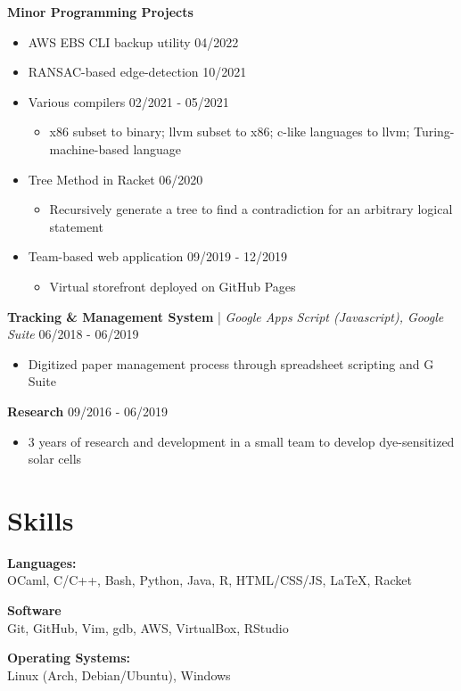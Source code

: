 \documentclass[10pt,letterpaper]{article}
\begin{document}
    \textbf{Minor Programming Projects}\hfill
    \begin{itemize}
      \item AWS EBS CLI backup utility \hfill 04/2022
      \item RANSAC-based edge-detection \hfill 10/2021
      \item Various compilers \hfill 02/2021 - 05/2021
        \begin{itemize}
          \item x86 subset to binary; llvm subset to x86; c-like languages to llvm; Turing-machine-based language
        \end{itemize}
      \item Tree Method in Racket \hfill 06/2020
        \begin{itemize}
          \item Recursively generate a tree to find a contradiction for an arbitrary logical statement
        \end{itemize}
      \item Team-based web application \hfill 09/2019 - 12/2019
        \begin{itemize}
          \item Virtual storefront deployed on GitHub Pages
        \end{itemize}
    \end{itemize}

    \textbf{Tracking \& Management System} | \textit{Google Apps Script (Javascript), Google Suite}\hfill
      06/2018 - 06/2019
      \begin{itemize}
        \item Digitized paper management process through spreadsheet scripting and G Suite
      \end{itemize}

    \textbf{Research}\hfill
    09/2016 - 06/2019
    \begin{itemize}
      \item 3 years of research and development in a small team to develop dye-sensitized solar cells
    \end{itemize}
    
  \section{Skills}
    \textbf{Languages:}\\
    OCaml, C/C++, Bash, Python, Java, R, HTML/CSS/JS, LaTeX, Racket
    
    \begin{minipage}[t]{3.5in}
      \textbf{Software}\\
      Git, GitHub, Vim, gdb, AWS, VirtualBox, RStudio
    \end{minipage}\hfill
    \begin{minipage}[t]{2.5in}
      \textbf{Operating Systems:}\\
      Linux (Arch, Debian/Ubuntu), Windows
    \end{minipage}
    
\end{document}
